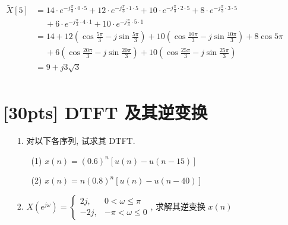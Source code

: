\documentclass[a4paper,UTF8]{article}
\numberwithin{equation}{section}
\renewcommand{\tilde}{\widetilde}
\begin{document}
\begin{framed}
\begin{spacing}{1.5}
\begin{itemize}
        $
        \begin{aligned}
        \tilde{X}[5] & = 14 \cdot e^{-j \frac{\pi}{3} \cdot 0 \cdot 5} + 12 \cdot e^{-j \frac{\pi}{3} \cdot 1 \cdot 5} + 10 \cdot e^{-j \frac{\pi}{3} \cdot 2 \cdot 5} + 8 \cdot e^{-j \frac{\pi}{3} \cdot 3 \cdot 5} \\
        &\quad\ + 6 \cdot e^{-j \frac{\pi}{3} \cdot 4 \cdot 1} + 10 \cdot e^{-j \frac{\pi}{3} \cdot 5 \cdot 1}  \\
        & = 14 + 12(\cos\frac{5\pi}{3} - j\sin\frac{5\pi}{3}) + 10(\cos\frac{10\pi}{3} - j\sin\frac{10\pi}{3}) + 8\cos 5\pi  \\
        &\quad\ + 6(\cos\frac{20\pi}{3} - j\sin\frac{20\pi}{3}) + 10(\cos\frac{25\pi}{3} - j\sin\frac{25\pi}{3})  \\
        & = 9 + j 3 \sqrt{3}  \\
        \end{aligned}
        $
			\end{itemize}
		\end{spacing}
	\end{framed}
	
	\newpage
	\section{[30pts] DTFT 及其逆变换}
	\begin{itemize}
		\item[1.] 对以下各序列, 试求其 DTFT.
		\begin{itemize}
			\item[(1)] $x(n)=(0.6)^n[u(n)-u(n-15)]$
			\item[(2)] $x(n)=n(0.8)^n[u(n)-u(n-40)]$
		\end{itemize}
		\item[2.] $ X(e^{j\omega})= \begin{cases}2j, & 0<\omega \leqslant \pi \\ -2j, & -\pi<\omega \leqslant 0\end{cases} $, 求解其逆变换 $ x(n) $
	\end{itemize}
	
\end{document}
